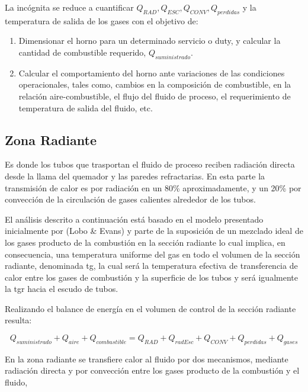 \par La incógnita se reduce a cuantificar $Q_{RAD}, Q_{ESC}, Q_{CONV}, Q_{perdidas}$ y la temperatura de salida de los gases con el objetivo de:
\begin{enumerate}
    \item Dimensionar el horno para un determinado servicio o duty, y calcular la cantidad de combustible requerido, $Q_{suministrado}$.
    \item Calcular el comportamiento del horno ante variaciones de las condiciones operacionales, tales como, cambios en la composición de combustible, en la relación aire-combustible, el flujo del fluido de proceso, el requerimiento de temperatura de salida del fluido, etc.
\end{enumerate}

\subsection{Zona Radiante}
\par Es donde los tubos que trasportan el fluido de proceso reciben radiación directa desde la llama del quemador y las paredes refractarias. En esta parte la transmisión de calor es por radiación en un 80\% aproximadamente, y un 20\% por convección de la circulación de gases calientes alrededor de los tubos.

\par El análisis descrito a continuación está basado en el modelo presentado inicialmente por (Lobo \& Evans)\cite{bib:rad} y parte de la suposición de un mezclado ideal de los gases producto de la combustión en la sección radiante lo cual implica, en consecuencia, una temperatura uniforme del gas en todo el volumen de la sección radiante, denominada \ac{tg}, la cual será la temperatura efectiva de transferencia de calor entre los gases de combustión y la superficie de los tubos y será igualmente la \ac{tgr} hacia el escudo de tubos.

\par Realizando el balance de energía en el volumen de control de la sección radiante resulta:

\begin{equation}
    \label{eq:rad}
    Q_{suministrado} + Q_{aire} + Q_{combustible} = 
    Q_{RAD} + Q_{radEsc} + Q_{CONV} + Q_{perdidas} + Q_{gases}
\end{equation}

\par En la zona radiante se transfiere calor al fluido por dos mecanismos, mediante radiación directa y por convección entre los gases producto de la combustión y el fluido,

